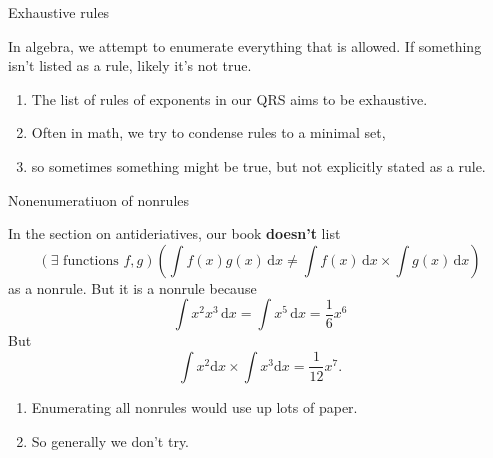 \documentclass[portrait,fleqn,12pt]{beamer}
\newenvironment{handlist}
   {\begin{enumerate}[\faHandPointRight]
       \addtolength{\itemsep}{0.0\itemsep}}
     {\end{enumerate}}
\begin{document}
\begin{frame}{Exhaustive rules}

In algebra, we attempt to enumerate everything that is allowed. If something isn't listed as a rule, likely it's not true.

\begin{handlist}
\item The list of rules of exponents in our QRS aims to be exhaustive.

\item  Often in math, we try  to condense rules to a minimal set, 

\item so sometimes something might be true, but not explicitly stated as a rule.
\end{handlist}

\end{frame}

\begin{frame}{Nonenumeratiuon of nonrules}

In the section on antideriatives, our book \textbf{doesn't} list
\begin{equation*}
 \left(\exists \text{ functions    } f,g \right) \left(
    \int f(x) g(x) \, \mathrm{d} x \neq  \int f(x) \, \mathrm{d} x 
     \times \int g(x) \, \mathrm{d} x \right)
\end{equation*}
as a nonrule. But it is a nonrule because 
\begin{equation*}
  \int x^2 x^3 \, \mathrm{d} x = \int x^5 \, \mathrm{d} x = \frac{1}{6} x^6
\end{equation*}
But
\begin{equation*}
  \int x^2 \mathrm{d} x \times \int x^3 \mathrm{d} x  = \frac{1}{12} x^7.
\end{equation*}

\begin{handlist}
\item Enumerating all nonrules would use up lots of paper.
\item So generally we don't try.
\end{handlist}
  
\end{frame}
\end{document}
